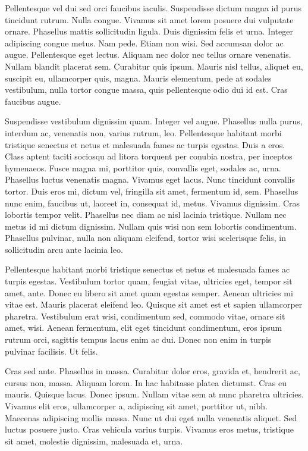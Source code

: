 Pellentesque vel dui sed orci faucibus iaculis. Suspendisse dictum magna id purus tincidunt rutrum. Nulla congue. Vivamus sit amet lorem posuere dui vulputate ornare. Phasellus mattis sollicitudin ligula. Duis dignissim felis et urna. Integer adipiscing congue metus. Nam pede. Etiam non wisi. Sed accumsan dolor ac augue. Pellentesque eget lectus. Aliquam nec dolor nec tellus ornare venenatis. Nullam blandit placerat sem. Curabitur quis ipsum. Mauris nisl tellus, aliquet eu, suscipit eu, ullamcorper quis, magna. Mauris elementum, pede at sodales vestibulum, nulla tortor congue massa, quis pellentesque odio dui id est. Cras faucibus augue.

Suspendisse vestibulum dignissim quam. Integer vel augue. Phasellus nulla purus, interdum ac, venenatis non, varius rutrum, leo. Pellentesque habitant morbi tristique senectus et netus et malesuada fames ac turpis egestas. Duis a eros. Class aptent taciti sociosqu ad litora torquent per conubia nostra, per inceptos hymenaeos. Fusce magna mi, porttitor quis, convallis eget, sodales ac, urna. Phasellus luctus venenatis magna. Vivamus eget lacus. Nunc tincidunt convallis tortor. Duis eros mi, dictum vel, fringilla sit amet, fermentum id, sem. Phasellus nunc enim, faucibus ut, laoreet in, consequat id, metus. Vivamus dignissim. Cras lobortis tempor velit. Phasellus nec diam ac nisl lacinia tristique. Nullam nec metus id mi dictum dignissim. Nullam quis wisi non sem lobortis condimentum. Phasellus pulvinar, nulla non aliquam eleifend, tortor wisi scelerisque felis, in sollicitudin arcu ante lacinia leo.

Pellentesque habitant morbi tristique senectus et netus et malesuada fames ac turpis egestas. Vestibulum tortor quam, feugiat vitae, ultricies eget, tempor sit amet, ante. Donec eu libero sit amet quam egestas semper. Aenean ultricies mi vitae est. Mauris placerat eleifend leo. Quisque sit amet est et sapien ullamcorper pharetra. Vestibulum erat wisi, condimentum sed, commodo vitae, ornare sit amet, wisi. Aenean fermentum, elit eget tincidunt condimentum, eros ipsum rutrum orci, sagittis tempus lacus enim ac dui. Donec non enim in turpis pulvinar facilisis. Ut felis.

Cras sed ante. Phasellus in massa. Curabitur dolor eros, gravida et, hendrerit ac, cursus non, massa. Aliquam lorem. In hac habitasse platea dictumst. Cras eu mauris. Quisque lacus. Donec ipsum. Nullam vitae sem at nunc pharetra ultricies. Vivamus elit eros, ullamcorper a, adipiscing sit amet, porttitor ut, nibh. Maecenas adipiscing mollis massa. Nunc ut dui eget nulla venenatis aliquet. Sed luctus posuere justo. Cras vehicula varius turpis. Vivamus eros metus, tristique sit amet, molestie dignissim, malesuada et, urna.

